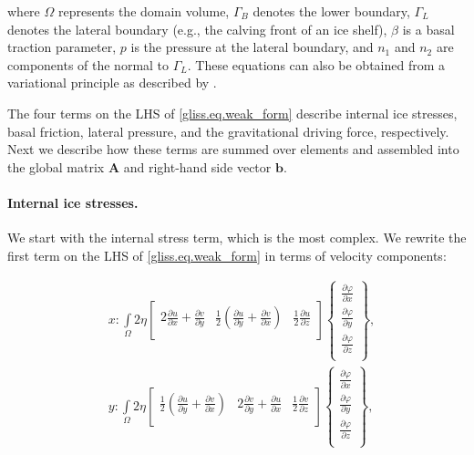 \noindent
where $\Omega$ represents the domain volume, $\Gamma_{B}$ denotes the lower boundary, $\Gamma_{L}$ denotes the lateral
boundary (e.g., the calving front of an ice shelf), $\beta$ is a basal traction parameter, $p$ is the pressure at the 
lateral boundary, and $n_1$ and $n_2$ are components of the normal to $\Gamma_L$.
These equations can also be obtained from a variational principle as described by \citet{DUKOWICZ:2010wb}.

The four terms on the LHS of \eqref{gliss.eq.weak_form} describe internal ice stresses, basal friction, lateral pressure,
and the gravitational driving force, respectively.  Next we describe how these terms are summed over elements
and assembled into the global matrix $\mathbf{A}$ and right-hand side vector $\mathbf{b}$.

\paragraph{Internal ice stresses.}

We start with the internal stress term, which is the most complex.
We rewrite the first term on the LHS of \eqref{gliss.eq.weak_form} in terms of velocity components:

\begin{equation}
  \label{gliss.eq.weak_form_velo}
  \begin{aligned}
    & x: \int\limits_{\Omega }{2\eta \left[ \begin{matrix}
          2\frac{\partial u}{\partial x}+\frac{\partial v}{\partial y} & \frac{1}{2}\left( \frac{\partial u}{\partial y}+\frac{\partial v}{\partial x} \right) & \frac{1}{2}\frac{\partial u}{\partial z}  \\
\end{matrix} \right]}\left\{ \begin{matrix}
      \frac{\partial \varphi }{\partial x}  \\[6pt]
      \frac{\partial \varphi }{\partial y}  \\[6pt]
      \frac{\partial \varphi }{\partial z}  \\
    \end{matrix} \right\},  \\
    & y: \int\limits_{\Omega }{2\eta \left[ \begin{matrix}
          \frac{1}{2}\left( \frac{\partial u}{\partial y}+\frac{\partial v}{\partial x} \right) & 2\frac{\partial v}{\partial y}+\frac{\partial u}{\partial x} & \frac{1}{2}\frac{\partial v}{\partial z}  \\
        \end{matrix} \right]}\left\{ \begin{matrix}
      \frac{\partial \varphi }{\partial x}  \\[6pt]
      \frac{\partial \varphi }{\partial y}  \\[6pt]
      \frac{\partial \varphi }{\partial z}  \\
    \end{matrix} \right\},  \\
  \end{aligned}
\end{equation}

